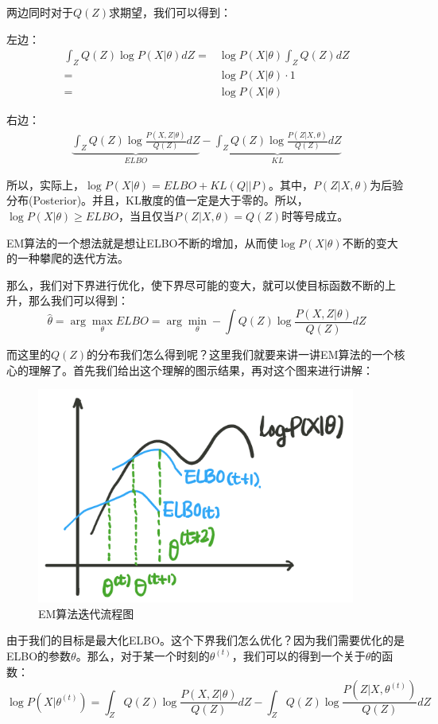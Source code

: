\documentclass[a4paper]{article}
\begin{document}
两边同时对于$Q(Z)$求期望，我们可以得到：

左边：
\begin{equation}
    \begin{split}
    \int_Z Q(Z)\log P(X|\theta)  dZ 
    = &  \log P(X|\theta) \int_Z Q(Z) dZ \\    
    = &  \log P(X|\theta) \cdot 1 \\
    = &  \log P(X|\theta)
    \end{split}
\end{equation}

右边：
\begin{equation}
    \begin{split}
        \underbrace{\int_Z Q(Z) \log \frac{P(X,Z|\theta)}{Q(Z)}dZ}_{ELBO} - 
        \underbrace{\int_Z Q(Z) \log \frac{P(Z|X,\theta)}{Q(Z)}dZ}_{KL}
    \end{split}
\end{equation}

所以，实际上，$\log P(X|\theta) = ELBO + KL(Q||P)$。其中，$P(Z|X,\theta)$为后验分布(Posterior)。并且，KL散度的值一定是大于零的。所以，$\log P(X|\theta) \geq ELBO$，当且仅当$P(Z|X,\theta) = Q(Z)$时等号成立。

{\color{red} EM算法的一个想法就是想让ELBO不断的增加，从而使$\log P(X|\theta)$不断的变大的一种攀爬的迭代方法。}

那么，我们对下界进行优化，使下界尽可能的变大，就可以使目标函数不断的上升，那么我们可以得到：
\begin{equation}
    \hat{\theta} = \arg\max_{\theta} ELBO = \arg\min_{\theta} -\int Q(Z)\log \frac{P(X,Z|\theta)}{Q(Z)}dZ
\end{equation}

而这里的$Q(Z)$的分布我们怎么得到呢？这里我们就要来讲一讲EM算法的一个核心的理解了。首先我们给出这个理解的图示结果，再对这个图来进行讲解：
\begin{figure}[H]
    \centering
    \includegraphics[width=.40\textwidth]{微信图片_20191218203645.png}
    \caption{EM算法迭代流程图}
    \label{fig:my_label_1}
\end{figure}

由于我们的目标是最大化ELBO。这个下界我们怎么优化？因为我们需要优化的是ELBO的参数$\theta$。那么，对于某一个时刻的$\theta^{(t)}$，我们可以的得到一个关于$\theta$的函数：
\begin{equation}
    \log P(X|\theta^{(t)}) = \int_Z Q(Z) \log \frac{P(X,Z|\theta)}{Q(Z)}dZ - \int_Z Q(Z) \log \frac{P(Z|X,\theta^{(t)})}{Q(Z)}dZ
\end{equation}
\end{document}
